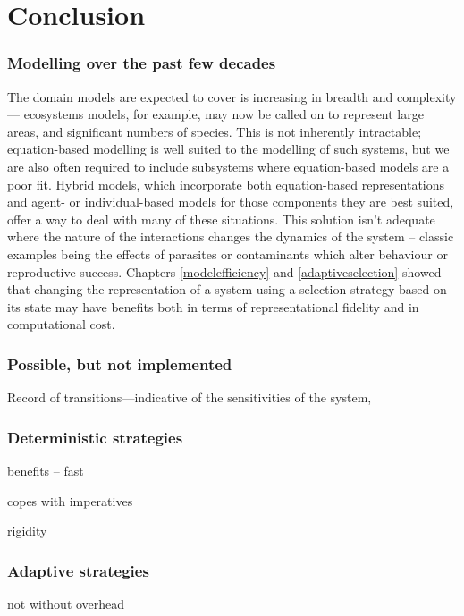 
\chapter[CONCLUSION]{Conclusion} \label{concl}

\subsection{Modelling over the past few decades}

The domain models are expected to cover is increasing in breadth and
complexity --- ecosystems models, for example, may now be called on to
represent large areas, and significant numbers of species.  This is
not inherently intractable; equation-based modelling is well suited to
the modelling of such systems, but we are also often required to
include subsystems where equation-based models are a poor fit. Hybrid
models, which incorporate both equation-based representations and
agent- or individual-based models for those components they are best
suited, offer a way to deal with many of these situations.  This
solution isn't adequate where the nature of the interactions changes
the dynamics of the system -- classic examples being the effects of
parasites or contaminants which alter behaviour or reproductive
success. Chapters \ref{modelefficiency} and \ref{adaptiveselection}
showed that changing the representation of a system using a selection
strategy based on its state may have benefits both in terms of
representational fidelity and in computational cost.  

\subsection{Possible, but not implemented}

Record of transitions---indicative of the sensitivities of the
system, 




\subsection{Deterministic strategies}
benefits -- fast

copes with imperatives

rigidity

\subsection{Adaptive strategies}
not without overhead

